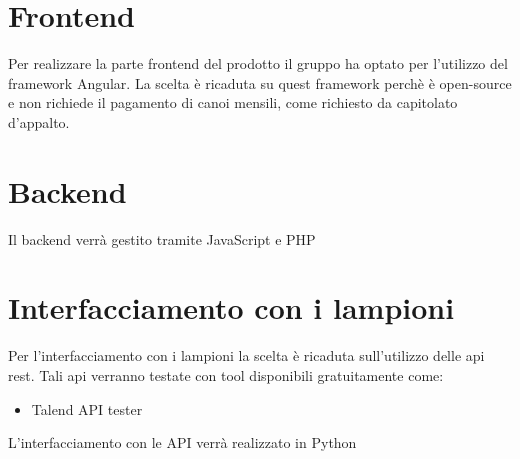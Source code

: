 \documentclass[12pt]{article}
\begin{document}
\section{Frontend}
Per realizzare la parte frontend del prodotto il gruppo ha optato per l'utilizzo del framework Angular. La scelta è ricaduta su quest framework perchè è open-source e non richiede il pagamento di canoi mensili, come richiesto da capitolato d'appalto.

\section{Backend}
Il backend verrà gestito tramite JavaScript e PHP
\section{Interfacciamento con i lampioni}
Per l'interfacciamento con i lampioni la scelta è ricaduta sull'utilizzo delle api rest.
Tali api verranno testate con tool disponibili gratuitamente come:
\begin{itemize}
    \item Talend API tester 
\end{itemize}
L'interfacciamento con le API verrà realizzato in Python
\end{document}
